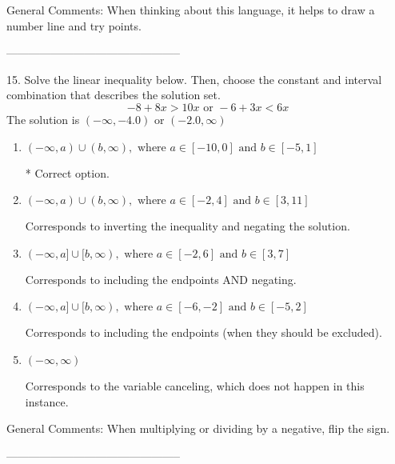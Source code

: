 \documentclass{extbook}[14pt]
\begin{document}
General Comments: When thinking about this language, it helps to draw a number line and try points.

-----------------------------------------------

15. Solve the linear inequality below. Then, choose the constant and interval combination that describes the solution set.
\[ -8 + 8 x > 10 x \text{ or } -6 + 3 x < 6 x \] 
The solution is $ (-\infty, -4.0) \text{ or } (-2.0, \infty) $ 

\begin{enumerate}[label=\Alph*.] 
\item $ (-\infty, a) \cup (b, \infty), \text{ where } a \in [-10, 0] \text{ and } b \in [-5, 1] $ 

  * Correct option. 
\item $ (-\infty, a) \cup (b, \infty), \text{ where } a \in [-2, 4] \text{ and } b \in [3, 11] $ 

 Corresponds to inverting the inequality and negating the solution. 
\item $ (-\infty, a] \cup [b, \infty), \text{ where } a \in [-2, 6] \text{ and } b \in [3, 7] $ 

 Corresponds to including the endpoints AND negating. 
\item $ (-\infty, a] \cup [b, \infty), \text{ where } a \in [-6, -2] \text{ and } b \in [-5, 2] $ 

 Corresponds to including the endpoints (when they should be excluded). 
\item $ (-\infty, \infty) $ 

 Corresponds to the variable canceling, which does not happen in this instance. 
\end{enumerate} 
 
General Comments: When multiplying or dividing by a negative, flip the sign.

-----------------------------------------------
\end{document}
